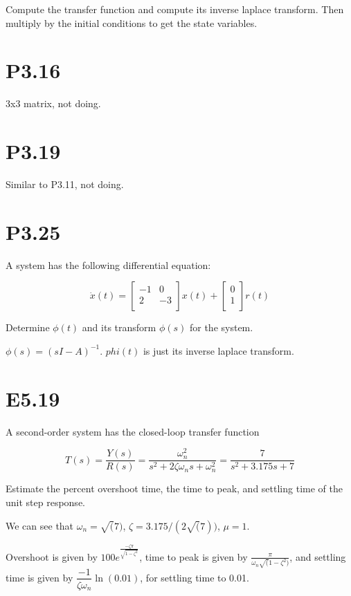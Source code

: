 \documentclass[11pt]{article}
\begin{document}
Compute the transfer function and compute its inverse laplace transform. Then multiply by the initial conditions to get the state variables.

\section{P3.16}

3x3 matrix, not doing.

\section{P3.19}

Similar to P3.11, not doing.

\section{P3.25}

A system has the following differential equation:

\[ 
    \dot x(t) =
    \begin{bmatrix}
        -1 & 0 \\
        2 & -3 \\
    \end{bmatrix}
    x(t) + 
    \begin{bmatrix}
        0 \\
        1 \\
    \end{bmatrix}
    r(t)
\]

Determine $\phi(t)$ and its transform $\phi(s)$ for the system.

$\phi(s) = (sI - A)^{-1}$. $phi(t)$ is just its inverse laplace transform.

\section{E5.19}

A second-order system has the closed-loop transfer function

\[
    T(s) = \dfrac{Y(s)}{R(s)} = \dfrac{\omega^2_n}{s^2 + 2 \zeta \omega_n s + \omega^2_n} = \dfrac{7}{s^2 + 3.175s + 7}
\]

Estimate the percent overshoot time, the time to peak, and settling time of the unit step response.

We can see that $\omega_n = \sqrt(7)$, $\zeta = 3.175 / (2 \sqrt(7))$, $\mu = 1$.

Overshoot is given by $100e^{\frac{-\zeta \pi}{\sqrt{1 - \zeta^2}}}$, time to peak is given by $\frac{\pi}{\omega_n \sqrt(1 - \zeta^2)}$, and settling time is given by $\dfrac{-1}{\zeta \omega_n} \ln (0.01)$, for settling time to 0.01.
\end{document}
